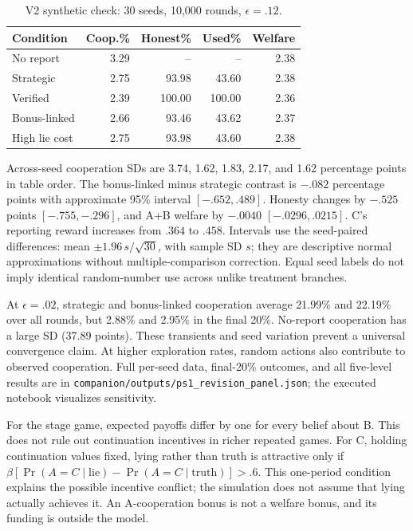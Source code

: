 \begin{table}[h]
\caption{V2 synthetic check: 30 seeds, 10,000 rounds, $\epsilon=.12$.}
\begin{tabularx}{\columnwidth}{@{}Yrrrr@{}}\toprule
Condition & Coop.\% & Honest\% & Used\% & Welfare\\\midrule
No report & 3.29 & -- & -- & 2.38\\
Strategic & 2.75 & 93.98 & 43.60 & 2.38\\
Verified & 2.39 & 100.00 & 100.00 & 2.36\\
Bonus-linked & 2.66 & 93.46 & 43.62 & 2.37\\
High lie cost & 2.75 & 93.98 & 43.60 & 2.38\\\bottomrule
\end{tabularx}
\end{table}

Across-seed cooperation SDs are 3.74, 1.62, 1.83, 2.17, and 1.62 percentage points in table order. The bonus-linked minus strategic contrast is $-.082$ percentage points with approximate 95\% interval $[-.652,.489]$. Honesty changes by $-.525$ points $[-.755,-.296]$, and A+B welfare by $-.0040$ $[-.0296,.0215]$. C's reporting reward increases from $.364$ to $.458$. Intervals use the seed-paired differences: mean $\pm1.96\,s/\sqrt{30}$, with sample SD $s$; they are descriptive normal approximations without multiple-comparison correction. Equal seed labels do not imply identical random-number use across unlike treatment branches.

At $\epsilon=.02$, strategic and bonus-linked cooperation average 21.99\% and 22.19\% over all rounds, but 2.88\% and 2.95\% in the final 20\%. No-report cooperation has a large SD (37.89 points). These transients and seed variation prevent a universal convergence claim. At higher exploration rates, random actions also contribute to observed cooperation. Full per-seed data, final-20\% outcomes, and all five-level results are in \texttt{companion/outputs/ps1\_revision\_panel.json}; the executed notebook visualizes sensitivity.

For the stage game, expected payoffs differ by one for every belief about B. This does not rule out continuation incentives in richer repeated games. For C, holding continuation values fixed, lying rather than truth is attractive only if $\beta[\Pr(A=C\mid\mathrm{lie})-\Pr(A=C\mid\mathrm{truth})]>.6$. This one-period condition explains the possible incentive conflict; the simulation does not assume that lying actually achieves it. An A-cooperation bonus is not a welfare bonus, and its funding is outside the model.

